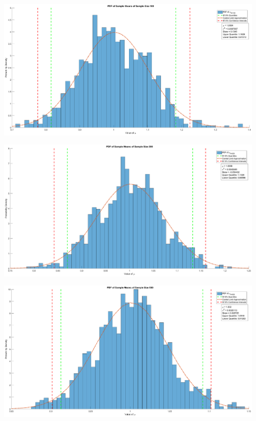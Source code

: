 \documentclass[12pt]{article}
\begin{document}
\includegraphics [width=\textwidth]{prob4_06.eps}

\includegraphics [width=\textwidth]{prob4_07.eps}

\includegraphics [width=\textwidth]{prob4_08.eps}
\end{document}
